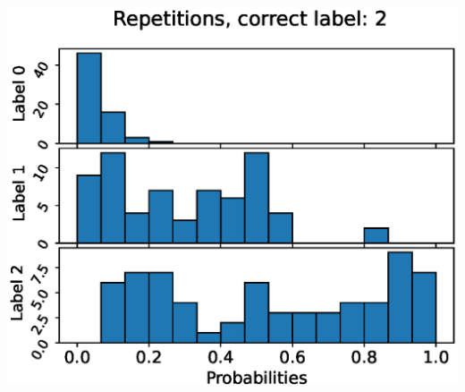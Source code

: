 \begin{center}
\begin{minipage}{0.33\textwidth}
\end{minipage}%
\begin{minipage}{0.33\textwidth}
  \includegraphics[width=\textwidth]{files/figs/app/hists/trunk/r2.eps}
\end{minipage}


\end{center}
